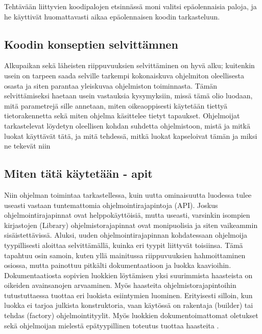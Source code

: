 \documentclass[finnish]{../tktltiki2}
\theoremstyle{definition}
\theoremstyle{remark}
\begin{document}
Tehtävään liittyvien koodipalojen etsinnässä moni valitsi epäolennaisia paloja, ja he käyttivät huomattavasti aikaa epäolennaisen koodin tarkasteluun.  \cite{eliciting-design-requirements-for-maintenance-oriented-ides}
\subsection{Koodin konseptien selvittämnen}
Alkupaikan sekä läheisten riippuvuuksien selvittäminen on hyvä alku; kuitenkin usein on tarpeen saada selville tarkempi kokonaiskuva ohjelmiton oleellisesta osasta ja siten parantaa yleiskuvaa ohjelmiston toiminnasta. Tämän selvittämiseksi haetaan usein vastauksia kysymyksiin, missä tämä olio luodaan, mitä parametrejä sille annetaan, miten oikeaoppisesti käytetään tiettyä tietorakennetta sekä miten ohjelma käsittelee tietyt tapaukset. Ohjelmoijat tarkastelevat löydetyn oleellisen kohdan suhdetta ohjelmistoon, mistä ja mitkä luokat käyttävät tätä, ja mitä tehdessä, mitkä luokat kapseloivat tämän ja miksi ne tekevät niin~\cite{questions-during-software-evolution-tasks,eliciting-design-requirements-for-maintenance-oriented-ides}

\subsection{Miten tätä käytetään - apit}
Niin ohjelman toimintaa tarkastellessa, kuin uutta ominaisuutta luodessa tulee useasti vastaan tuntemattomia ohjelmointirajapintoja (API). Joskus ohjelmointirajapinnat ovat helppokäyttöisiä, mutta useasti, varsinkin isompien kirjastojen (Library) ohjelmistorajapinnat ovat monipuolisia ja siten vaikeammin sisäistettävissä. Aluksi, uuden ohjelmointirajapinnan kohdatessaan ohjelmoija tyypillisesti aloittaa selvittämällä, kuinka eri tyypit liittyvät toisiinsa. Tämä tapahtuu osin samoin, kuten yllä mainitussa riippuvuuksien hahmoittaminen osiossa, mutta painottuu pitkälti dokumentaatioon ja luokka kaavioihin. Dokumentaatiosta sopivien luokkien löytämisen yksi suurimmista haasteista on oikeiden avainsanojen arvaaminen. Myös haasteita ohjelmistorajapintoihin tutustuttaessa tuottaa eri luokista esiintymien luominen. Erityisesti silloin, kun luokka ei tarjoa julkista konstruktoria, vaan käytössä on rakentaja (builder) tai tehdas (factory) ohjelmointityylit. Myös luokkien dokumentoimattomat oletukset sekä ohjelmoijan mielestä epätyypillinen toteutus tuottaa haasteita \cite{asking-and-answering-api-questions}.
\end{document}
